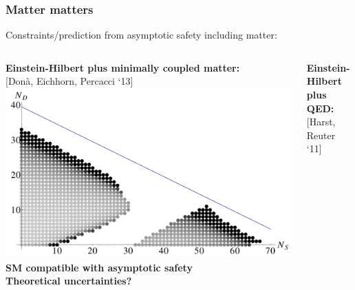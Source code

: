 \documentclass[]{beamer}  %
\begin{document}


\begin{frame}
  \frametitle{Matter matters}

  Constraints/prediction from asymptotic safety including matter:

  \vspace{10pt}

  \begin{columns}[T]
    \begin{column}{.5\textwidth}
      \begin{center}
        \fontsize{6pt}{7.2}\selectfont
        \textbf{
          Einstein-Hilbert plus minimally coupled matter:\\[1pt]
        }
        \hfill [Don\`a, Eichhorn, Percacci `13]
        \fontsize{8pt}{7.2}\selectfont
        \includegraphics[scale=0.12]{matter_matters.png}\\[19pt]
        \textbf{SM compatible with asymptotic safety}\\[10pt]
        \textbf{Theoretical uncertainties?}
      \end{center}
    \end{column}
    \begin{column}{.5\textwidth}
      \begin{center}
        \fontsize{6pt}{7.2}\selectfont
        \textbf{
          Einstein-Hilbert plus QED:\\[1pt]
        }
        \hfill [Harst, Reuter `11]
        \fontsize{8pt}{7.2}\selectfont

\end{center}
\end{column}
\end{columns}
\end{frame}
\end{document}
